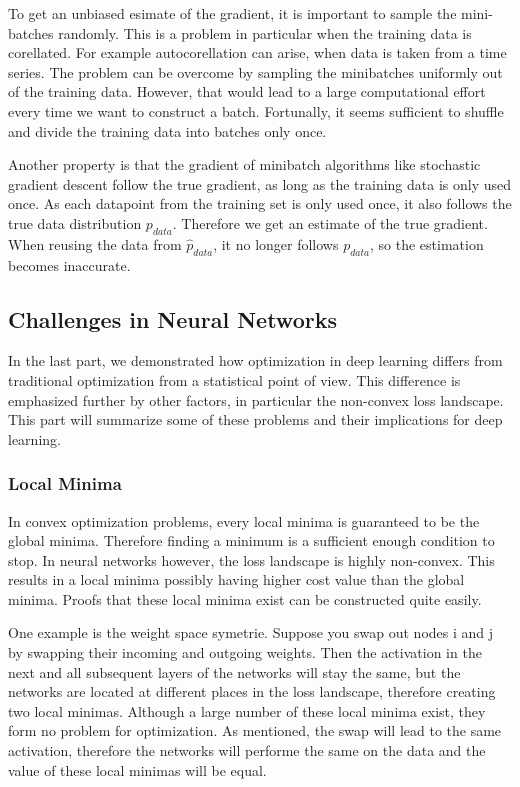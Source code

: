 To get an unbiased esimate of the gradient, it is important to sample the
mini-batches randomly. This is a problem in particular when the training data is
corellated. For example autocorellation can arise, when data is taken from a
time series. The problem can be overcome by sampling the minibatches uniformly
out of the training data. However, that would lead to a large computational
effort every time we want to construct a batch. Fortunally, it seems sufficient
to shuffle and divide the training data into batches only once.

Another property is that the gradient of minibatch algorithms like stochastic
gradient descent follow the true gradient, as long as the training data is only
used once. As each datapoint from the training set is only used once, it also
follows the true data distribution $p_{data}$. Therefore we get an estimate of
the true gradient. When reusing the data from $\hat{p}_{data}$, it no longer
follows $p_{data}$, so the estimation becomes inaccurate.

\subsection{Challenges in Neural Networks}
In the last part, we demonstrated how optimization in deep learning differs from
traditional optimization from a statistical point of view. This difference is
emphasized further by other factors, in particular the non-convex loss
landscape. This part will summarize some of these problems and their
implications for deep learning.


\subsubsection{Local Minima}\label{sub:Local_minima}
In convex optimization problems, every local minima is guaranteed to be the
global minima. Therefore finding a minimum is a sufficient enough condition to
stop. In neural networks however, the loss landscape is highly non-convex. This
results in a local minima possibly having higher cost value than the global
minima. Proofs that these local minima exist can be constructed quite easily.

One example is the weight space symetrie. Suppose you swap out nodes i and j by
swapping their incoming and outgoing weights. Then the activation in the next
and all subsequent layers of the networks will stay the same, but the networks
are located at different places in the loss landscape, therefore creating two
local minimas. Although a large number of these local minima exist, they form no
problem for optimization. As mentioned, the swap will lead to the same
activation, therefore the networks will performe the same on the data and the
value of these local minimas will be equal.

